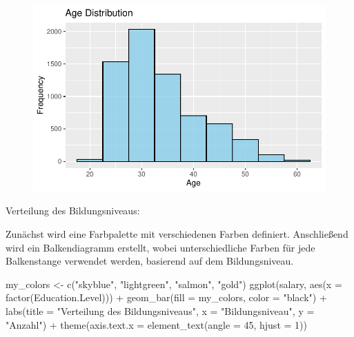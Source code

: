 \documentclass[
  letterpaper,
  DIV=11,
  numbers=noendperiod]{scrartcl}
\newenvironment{Shaded}{\begin{snugshade}}{\end{snugshade}}
\newcommand{\AttributeTok}[1]{\textcolor[rgb]{0.40,0.45,0.13}{#1}}
\newcommand{\DecValTok}[1]{\textcolor[rgb]{0.68,0.00,0.00}{#1}}
\newcommand{\FunctionTok}[1]{\textcolor[rgb]{0.28,0.35,0.67}{#1}}
\newcommand{\NormalTok}[1]{\textcolor[rgb]{0.00,0.23,0.31}{#1}}
\newcommand{\OtherTok}[1]{\textcolor[rgb]{0.00,0.23,0.31}{#1}}
\newcommand{\SpecialCharTok}[1]{\textcolor[rgb]{0.37,0.37,0.37}{#1}}
\newcommand{\StringTok}[1]{\textcolor[rgb]{0.13,0.47,0.30}{#1}}
\begin{document}
\begin{figure}[H]

{\centering \includegraphics{main_doc_files/figure-pdf/unnamed-chunk-8-1.pdf}

}

\end{figure}

Verteilung des Bildungsniveaus:

Zunächst wird eine Farbpalette mit verschiedenen Farben definiert.
Anschließend wird ein Balkendiagramm erstellt, wobei unterschiedliche
Farben für jede Balkenstange verwendet werden, basierend auf dem
Bildungsniveau.

\begin{Shaded}
\begin{Highlighting}[]
\NormalTok{my\_colors }\OtherTok{\textless{}{-}} \FunctionTok{c}\NormalTok{(}\StringTok{"skyblue"}\NormalTok{, }\StringTok{"lightgreen"}\NormalTok{, }\StringTok{"salmon"}\NormalTok{, }\StringTok{"gold"}\NormalTok{) }
\FunctionTok{ggplot}\NormalTok{(salary, }\FunctionTok{aes}\NormalTok{(}\AttributeTok{x =} \FunctionTok{factor}\NormalTok{(}\StringTok{\textasciigrave{}}\AttributeTok{Education.Level}\StringTok{\textasciigrave{}}\NormalTok{))) }\SpecialCharTok{+}
  \FunctionTok{geom\_bar}\NormalTok{(}\AttributeTok{fill =}\NormalTok{ my\_colors, }\AttributeTok{color =} \StringTok{"black"}\NormalTok{) }\SpecialCharTok{+}
  \FunctionTok{labs}\NormalTok{(}\AttributeTok{title =} \StringTok{"Verteilung des Bildungsniveaus"}\NormalTok{,}
       \AttributeTok{x =} \StringTok{"Bildungsniveau"}\NormalTok{,}
       \AttributeTok{y =} \StringTok{"Anzahl"}\NormalTok{) }\SpecialCharTok{+}
  \FunctionTok{theme}\NormalTok{(}\AttributeTok{axis.text.x =} \FunctionTok{element\_text}\NormalTok{(}\AttributeTok{angle =} \DecValTok{45}\NormalTok{, }\AttributeTok{hjust =} \DecValTok{1}\NormalTok{))}
\end{Highlighting}
\end{Shaded}
\end{document}
